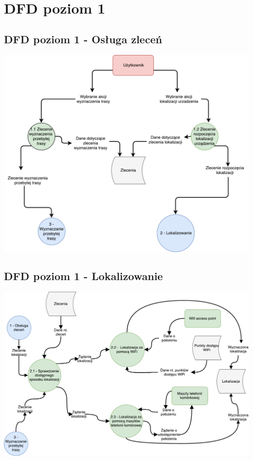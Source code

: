 \documentclass[11pt]{article}
\begin{document}
	\section{DFD poziom 1}
	\subsection{DFD poziom 1 - Osługa zleceń}
	\begin{center}
		\includegraphics[scale=0.7]{DFD1.pdf}
	\end{center}
	\subsection{DFD poziom 1 - Lokalizowanie}
	\begin{center}
		\includegraphics[scale=0.6]{DFD2.pdf}
	\end{center}
	\newpage
\end{document}
